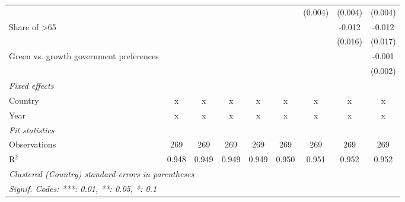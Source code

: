 \begin{table}[htbp]
\begin{tabular}{lcccccccc}
                                              &              &              &         &         &         & (0.004) & (0.004) & (0.004)\\   
      Share of >65                            &              &              &         &         &         &         & -0.012  & -0.012\\   
                                              &              &              &         &         &         &         & (0.016) & (0.017)\\   
      Green vs. growth government preferences &              &              &         &         &         &         &         & -0.001\\   
                                              &              &              &         &         &         &         &         & (0.002)\\   
      \emph{Fixed effects}\\
      Country                                 & x            & x            & x       & x       & x       & x       & x       & x\\  
      Year                                    & x            & x            & x       & x       & x       & x       & x       & x\\  
      \midrule \emph{Fit statistics}\\
      Observations                            & 269          & 269          & 269     & 269     & 269     & 269     & 269     & 269\\  
      R$^2$                                   & 0.948        & 0.949        & 0.949   & 0.949   & 0.950   & 0.951   & 0.952   & 0.952\\  
      \midrule
      \multicolumn{9}{l}{\emph{Clustered (Country) standard-errors in parentheses}}\\
      \multicolumn{9}{l}{\emph{Signif. Codes: ***: 0.01, **: 0.05, *: 0.1}}\\
   \end{tabular}
\end{table}


